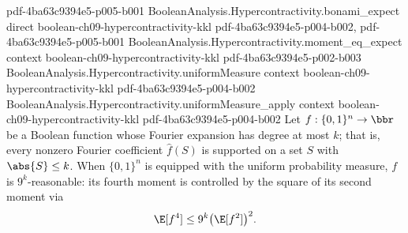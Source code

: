 \begin{lemma}
  {pdf-4ba63c9394e5-p005-b001}
\proofstep
  {BooleanAnalysis.Hypercontractivity.bonami_expect}
  {direct}
  {boolean-ch09-hypercontractivity-kkl}
  {pdf-4ba63c9394e5-p004-b002,
    pdf-4ba63c9394e5-p005-b001}
\proofstep
  {BooleanAnalysis.Hypercontractivity.moment_eq_expect}
  {context}
  {boolean-ch09-hypercontractivity-kkl}
  {pdf-4ba63c9394e5-p002-b003}
\proofstep
  {BooleanAnalysis.Hypercontractivity.uniformMeasure}
  {context}
  {boolean-ch09-hypercontractivity-kkl}
  {pdf-4ba63c9394e5-p004-b002}
\proofstep
  {BooleanAnalysis.Hypercontractivity.uniformMeasure_apply}
  {context}
  {boolean-ch09-hypercontractivity-kkl}
  {pdf-4ba63c9394e5-p004-b002}
Let $f : \{0,1\}^n \to \bbr$ be a Boolean function whose Fourier expansion has degree at
most $k$; that is, every nonzero Fourier coefficient $\hat f(S)$ is supported on a set
$S$ with $\abs{S} \le k$. When $\{0,1\}^n$ is equipped with the uniform probability
measure, $f$ is $9^k$-reasonable: its fourth moment is controlled by the square of its
second moment via
\[
\E[f^4] \le 9^k \bigl(\E[f^2]\bigr)^2 .
\]
\end{lemma}
